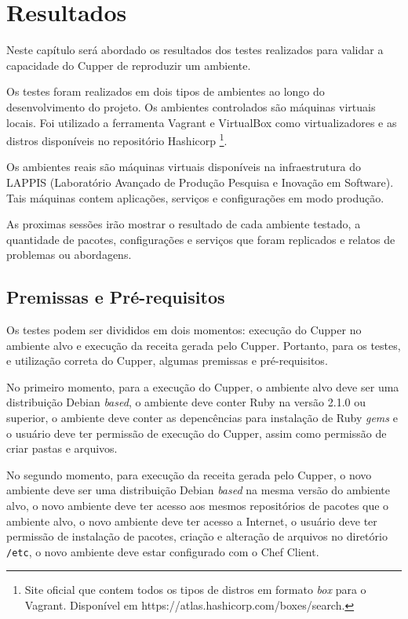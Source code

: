 \newpage\null\thispagestyle{empty}\newpage
\chapter{Resultados}
\label{chap:result}

Neste capítulo será abordado os resultados dos testes realizados
para validar a capacidade do Cupper de reproduzir um ambiente.

Os testes foram realizados em dois tipos de ambientes ao longo do
desenvolvimento do projeto. Os ambientes controlados são máquinas
virtuais locais. Foi utilizado a ferramenta Vagrant e VirtualBox
como virtualizadores e as distros disponíveis no repositório Hashicorp
\footnote{Site oficial que contem todos os tipos de distros em formato \textit{box} para o Vagrant. Disponível em https://atlas.hashicorp.com/boxes/search.}.

Os ambientes reais são máquinas virtuais disponíveis na infraestrutura
do LAPPIS (Laboratório Avançado de Produção Pesquisa e Inovação em Software).
Tais máquinas contem aplicações, serviços e configurações em modo produção.

As proximas sessões irão mostrar o resultado de cada ambiente testado,
a quantidade de pacotes, configurações e serviços que foram replicados
e relatos de problemas ou abordagens.

\section{Premissas e Pré-requisitos}

Os testes podem ser divididos em dois momentos: execução do Cupper no
ambiente alvo e execução da receita gerada pelo Cupper. Portanto,
para os testes, e utilização correta do Cupper, algumas premissas
e pré-requisitos.

No primeiro momento, para a execução do Cupper, o ambiente alvo deve
ser uma distribuição Debian \textit{based}, o ambiente deve conter Ruby na versão
2.1.0 ou superior, o ambiente deve conter as depencências para instalação
de Ruby \textit{gems} e o usuário deve ter permissão de execução do Cupper, assim como
permissão de criar pastas e arquivos.

No segundo momento, para execução da receita gerada pelo Cupper, o novo
ambiente deve ser uma distribuição Debian \textit{based} na mesma versão do ambiente
alvo, o novo ambiente deve ter acesso aos mesmos repositórios de pacotes que
o ambiente alvo, o novo ambiente deve ter acesso a Internet, o usuário deve
ter permissão de instalação de pacotes, criação e alteração de arquivos no
diretório \texttt{/etc}, o novo ambiente deve estar configurado com o Chef Client.

